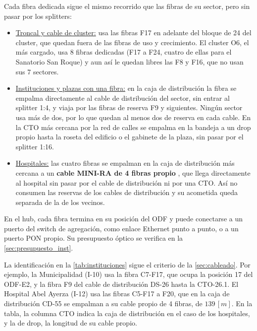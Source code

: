 Cada fibra dedicada sigue el mismo recorrido que las fibras de su sector, pero sin pasar por los splitters:
\begin{itemize}
    \item \underline{Troncal y cable de cluster:} usa las fibras F17 en adelante del bloque de 24 del cluster, que quedan fuera de las fibras de uso y crecimiento. El cluster O6, el más cargado, usa 8 fibras dedicadas (F17 a F24, cuatro de ellas para el Sanatorio San Roque) y aun así le quedan libres las F8 y F16, que no usan sus 7 sectores.
    \item \underline{Instituciones y plazas con una fibra:} en la caja de distribución la fibra se empalma directamente al cable de distribución del sector, sin entrar al splitter 1:4, y viaja por las fibras de reserva F9 y siguientes. Ningún sector usa más de dos, por lo que quedan al menos dos de reserva en cada cable. En la CTO más cercana por la red de calles se empalma en la bandeja a un drop propio hasta la roseta del edificio o el gabinete de la plaza, sin pasar por el splitter 1:16.
    \item \underline{Hospitales:} las cuatro fibras se empalman en la caja de distribución más cercana a un \textbf{cable MINI-RA de 4 fibras propio} \cite{et_minira}, que llega directamente al hospital sin pasar por el cable de distribución ni por una CTO. Así no consumen las reservas de los cables de distribución y su acometida queda separada de la de los vecinos.
\end{itemize}
En el hub, cada fibra termina en su posición del ODF y puede conectarse a un puerto del switch de agregación, como enlace Ethernet punto a punto, o a un puerto PON propio. Su presupuesto óptico se verifica en la \autoref{sec:presupuesto_inst}.



La identificación en la \autoref{tab:instituciones} sigue el criterio de la \autoref{sec:cableado}. Por ejemplo, la Municipalidad (I-10) usa la fibra C7-F17, que ocupa la posición 17 del ODF-E2, y la fibra F9 del cable de distribución DS-26 hasta la CTO-26.1. El Hospital Abel Ayerza (I-12) usa las fibras C5-F17 a F20, que en la caja de distribución CD-55 se empalman a su cable propio de 4 fibras, de $139 \, [m]$. En la tabla, la columna CTO indica la caja de distribución en el caso de los hospitales, y la de drop, la longitud de su cable propio.

